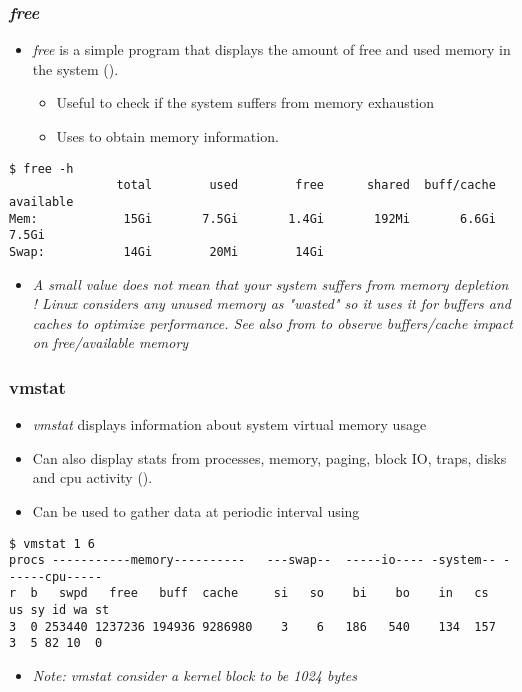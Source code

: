 \begin{frame}[fragile]
  \frametitle{{\em free}}
  \begin{itemize}
    \item {\em free} is a simple program that displays the amount of free and
          used memory in the system ().
    \begin{itemize}
      \item Useful to check if the system suffers from memory exhaustion
      \item Uses  to obtain memory information.
    \end{itemize}
  \end{itemize}
  \begin{block}{}
    \begin{verbatim}
$ free -h
               total        used        free      shared  buff/cache   available
Mem:            15Gi       7.5Gi       1.4Gi       192Mi       6.6Gi       7.5Gi
Swap:           14Gi        20Mi        14Gi
    \end{verbatim}
  \end{block}
  \begin{itemize}
    \item {\em A small  value does not mean that your system suffers
    from memory depletion ! Linux considers any unused memory as "wasted" so
    it uses it for buffers and caches to optimize performance. See also
     from  to observe buffers/cache
    impact on free/available memory}
  \end{itemize}
\end{frame}

\begin{frame}[fragile]
  \frametitle{vmstat}
  \begin{itemize}
    \item {\em vmstat} displays information about system virtual memory usage
    \item Can also display stats from processes, memory, paging, block IO,
          traps, disks and cpu activity ().
    \item Can be used to gather data at periodic interval using 
  \end{itemize}
  \begin{block}{}
    \begin{verbatim}
$ vmstat 1 6
procs -----------memory----------   ---swap--  -----io---- -system-- ------cpu-----
r  b   swpd   free   buff  cache     si   so    bi    bo    in   cs  us sy id wa st
3  0 253440 1237236 194936 9286980    3    6   186   540    134  157  3  5 82 10  0
    \end{verbatim}
  \end{block}
  \begin{itemize}
    \item {\em Note: vmstat consider a kernel block to be 1024 bytes}
  \end{itemize}
\end{frame}

